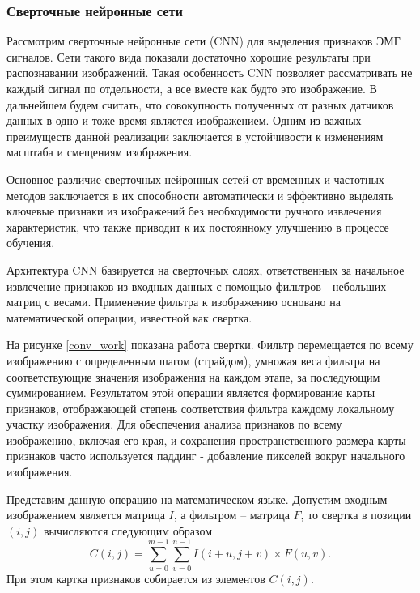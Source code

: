 \subsubsection{Сверточные нейронные сети}

Рассмотрим сверточные нейронные сети (CNN) для выделения признаков ЭМГ сигналов. Сети такого вида показали достаточно хорошие результаты при распознавании изображений. Такая особенность CNN позволяет рассматривать не каждый сигнал по отдельности, а все вместе как будто это изображение. В дальнейшем будем считать, что совокупность полученных от разных датчиков данных в одно и тоже время является изображением. Одним из важных преимуществ данной реализации заключается в устойчивости к изменениям масштаба и смещениям изображения.

Основное различие сверточных нейронных сетей от временных и частотных методов заключается в их способности автоматически и эффективно выделять ключевые признаки из изображений без необходимости ручного извлечения характеристик, что также приводит к их постоянному улучшению в процессе обучения.

Архитектура CNN базируется на сверточных слоях, ответственных за начальное извлечение признаков из входных данных с помощью фильтров - небольших матриц с весами. Применение фильтра к изображению основано на математической операции, известной как свертка.

На рисунке \ref{conv_work} показана работа свертки. Фильтр перемещается по всему изображению с определенным шагом (страйдом), умножая веса фильтра на соответствующие значения изображения на каждом этапе, за последующим суммированием. Результатом этой операции является формирование карты признаков, отображающей степень соответствия фильтра каждому локальному участку изображения. Для обеспечения анализа признаков по всему изображению, включая его края, и сохранения пространственного размера карты признаков часто используется паддинг - добавление пикселей вокруг начального изображения.


Представим данную операцию на математическом языке. Допустим входным изображением является матрица $I$, а фильтром -- матрица $F$, то свертка в позиции $(i,j)$ вычисляются следующим образом
\begin{equation}
    C(i,j) = \sum\limits_{u=0}^{m-1}\sum\limits_{v=0}^{n-1}I(i+u,j+v)\times F(u,v).
\end{equation}
При этом картка признаков собирается из элементов $C(i,j)$.

